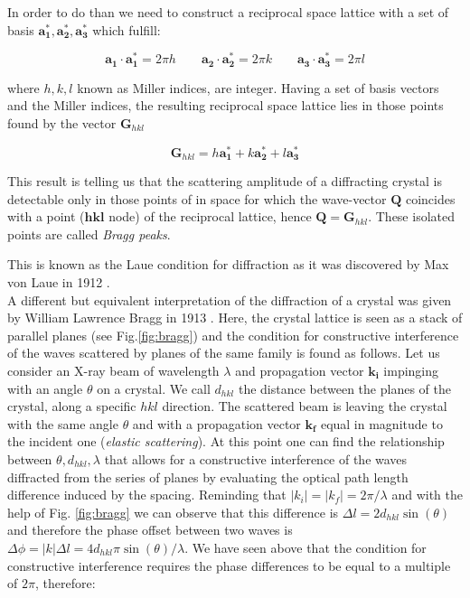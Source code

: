 In order to do than we need to construct a reciprocal space lattice with a set of basis ${\mathbf{a_1^\ast}, \mathbf{a_2^\ast}, \mathbf{a_3^\ast}}$ 
which fulfill: 

\begin{equation}
    \mathbf{a_1} \cdot \mathbf{a_1^\ast} = 2\pi h \qquad \mathbf{a_2} \cdot \mathbf{a_2^\ast} = 2\pi k \qquad \mathbf{a_3} \cdot \mathbf{a_3^\ast} = 2\pi l 
   \label{eq:miller}
\end{equation}

where $ h, k, l $ known as Miller indices, are integer. Having a set of basis vectors and the Miller indices, the 
resulting reciprocal space lattice lies in those points found by the vector $\mathbf{G}_{hkl}$ 

\begin{equation}
    \mathbf{G}_{hkl} =  h\mathbf{a_1^\ast} + k\mathbf{a_2^\ast} + l\mathbf{a_3^\ast} 
   \label{eq:G}
\end{equation}

This result is telling us that the scattering amplitude of a diffracting crystal is detectable only in those points of 
in space for which the wave-vector $\mathbf{Q}$ coincides with a point ($\mathbf{hkl}$ node) of the reciprocal lattice, 
hence $\mathbf{Q} = \mathbf{G}_{hkl}$. These isolated points are called \textit{Bragg peaks}.

This is known as the Laue condition for diffraction as it was discovered by Max von Laue in 1912 \cite{FriedrichKnippingLaue1912}.\\ 

A different but equivalent interpretation of the diffraction of a crystal was given by William Lawrence Bragg in 1913 \cite{Bragg1913}. 
Here, the crystal lattice is seen as a stack of parallel planes (see Fig.\ref{fig:bragg}) and the condition for constructive interference of 
the waves scattered by planes of the same family is found as follows.
Let us consider an X-ray beam of wavelength $\lambda$ and propagation vector $\mathbf{k_i} $ impinging with an angle $\theta$ 
on a crystal. We call $d_{hkl}$ the distance between the planes of the crystal, along a specific ${hkl}$ direction. The scattered 
beam is leaving the crystal with the 
same angle $\theta$ and with a propagation vector $\mathbf{k_f}$ equal in magnitude to the incident one (\textit{elastic scattering}). 
At this point one can find the relationship between $ \theta, d_{hkl}, \lambda$ that allows for a constructive interference of the 
waves diffracted from the series of planes by evaluating the optical path length difference induced by the spacing. 
Reminding that $\left|k_i\right| = \left|k_f\right| = 2\pi/\lambda $ and with the help of Fig. \ref{fig:bragg} we can observe that this 
difference is $\Delta l = 2 d_{hkl} \sin(\theta)$ and therefore the phase offset between two waves is $\Delta \phi = \left|k\right| \Delta l 
= 4 d_{hkl}\pi \sin(\theta)/\lambda $. We have seen above that the condition for constructive interference requires the phase 
differences to be equal to a multiple of $2\pi$, therefore: 

